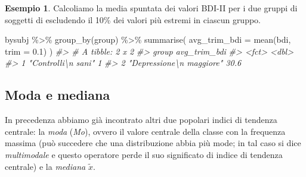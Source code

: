 \documentclass[
  10pt,
  italian,
  a4paper,
  extrafontsizes,onecolumn,openright
  ]{memoir}
\newenvironment{Shaded}{\begin{snugshade}}{\end{snugshade}}
\newcommand{\AttributeTok}[1]{\textcolor[rgb]{0.77,0.63,0.00}{#1}}
\newcommand{\CommentTok}[1]{\textcolor[rgb]{0.56,0.35,0.01}{\textit{#1}}}
\newcommand{\FloatTok}[1]{\textcolor[rgb]{0.00,0.00,0.81}{#1}}
\newcommand{\FunctionTok}[1]{\textcolor[rgb]{0.00,0.00,0.00}{#1}}
\newcommand{\NormalTok}[1]{#1}
\newcommand{\SpecialCharTok}[1]{\textcolor[rgb]{0.00,0.00,0.00}{#1}}
\theoremstyle{definition}
\theoremstyle{definition}
\newtheorem{example}{Esempio}[chapter]
\theoremstyle{definition}
\theoremstyle{definition}
\theoremstyle{remark}
\begin{document}
\begin{example}

Calcoliamo la media spuntata dei valori BDI-II per i due gruppi di soggetti di \textcite{zetschefuture2019} escludendo il 10\% dei valori più estremi in ciascun gruppo.

\begin{Shaded}
\begin{Highlighting}[]
\NormalTok{bysubj }\SpecialCharTok{\%\textgreater{}\%} 
  \FunctionTok{group\_by}\NormalTok{(group) }\SpecialCharTok{\%\textgreater{}\%} 
  \FunctionTok{summarise}\NormalTok{(}
    \AttributeTok{avg\_trim\_bdi =} \FunctionTok{mean}\NormalTok{(bdi, }\AttributeTok{trim =} \FloatTok{0.1}\NormalTok{)}
\NormalTok{  ) }
\CommentTok{\#\textgreater{} \# A tibble: 2 x 2}
\CommentTok{\#\textgreater{}   group                    avg\_trim\_bdi}
\CommentTok{\#\textgreater{}   \textless{}fct\textgreater{}                           \textless{}dbl\textgreater{}}
\CommentTok{\#\textgreater{} 1 "Controlli\textbackslash{}n sani"                1  }
\CommentTok{\#\textgreater{} 2 "Depressione\textbackslash{}n maggiore"         30.6}
\end{Highlighting}
\end{Shaded}

\end{example}

\hypertarget{moda-e-mediana}{%
\subsection{Moda e mediana}\label{moda-e-mediana}}

In precedenza abbiamo già incontrato altri due popolari indici di
tendenza centrale: la \emph{moda} (\emph{Mo}), ovvero il valore centrale della
classe con la frequenza massima (può succedere che una distribuzione
abbia più mode; in tal caso si dice \emph{multimodale} e questo operatore
perde il suo significato di indice di tendenza centrale) e la \emph{mediana}
\(\tilde{x}\).
\end{document}
